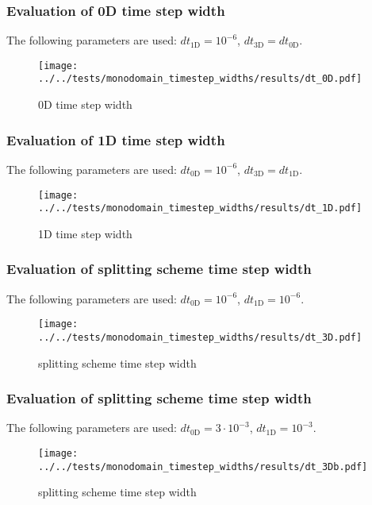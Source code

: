 %
\begin{frame}
  \frametitle{Evaluation of 0D time step width}
  \vspace*{-0.2cm}
  The following parameters are used: $dt_\text{1D}= 10^{-6}$, $dt_\text{3D} = dt_\text{0D}$.
  \begin{figure}[h!]
    \centering%
    \texttt{[image: ../../tests/monodomain\_timestep\_widths/results/dt\_0D.pdf]}%
    \caption{0D time step width}
  \end{figure} 
\end{frame}
%
\begin{frame}
  \frametitle{Evaluation of 1D time step width}
  \vspace*{-0.2cm}
  The following parameters are used: $dt_\text{0D}= 10^{-6}$, $dt_\text{3D} = dt_\text{1D}$.
  \begin{figure}[h!]
    \centering%
    \texttt{[image: ../../tests/monodomain\_timestep\_widths/results/dt\_1D.pdf]}%
    \caption{1D time step width}
  \end{figure} 
\end{frame}
%
\begin{frame}
  \frametitle{Evaluation of splitting scheme time step width}
  \vspace*{-0.2cm}
  The following parameters are used: $dt_\text{0D} = 10^{-6}$, $dt_\text{1D}= 10^{-6}$.
  \begin{figure}[h!]
    \centering%
    \texttt{[image: ../../tests/monodomain\_timestep\_widths/results/dt\_3D.pdf]}%
    \caption{splitting scheme time step width}
  \end{figure} 
\end{frame}
%
\begin{frame}
  \frametitle{Evaluation of splitting scheme time step width}
  \vspace*{-0.2cm}
  The following parameters are used: $dt_\text{0D}= 3\cdot 10^{-3}$, $dt_\text{1D} = 10^{-3}$.
  \begin{figure}[h!]
    \centering%
    \texttt{[image: ../../tests/monodomain\_timestep\_widths/results/dt\_3Db.pdf]}%
    \caption{splitting scheme time step width}
  \end{figure} 
\end{frame}
%
